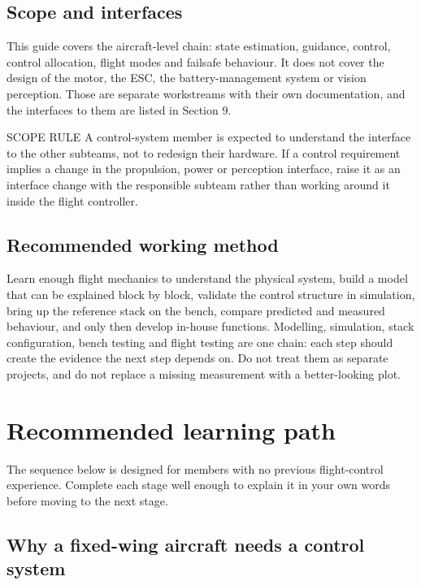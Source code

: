 \documentclass[11pt,a4paper]{article}
\begin{document}
\subsection{Scope and interfaces}

This guide covers the aircraft-level chain: state estimation, guidance,
control, control allocation, flight modes and failsafe behaviour. It does not
cover the design of the motor, the ESC, the battery-management system or
vision perception. Those are separate workstreams with their own documentation,
and the interfaces to them are listed in Section 9.

\begin{callout}{SCOPE RULE}
  A control-system member is expected to understand the interface to the other
  subteams, not to redesign their hardware. If a control requirement implies a
  change in the propulsion, power or perception interface, raise it as an
  interface change with the responsible subteam rather than working around it
  inside the flight controller.
\end{callout}

\subsection{Recommended working method}

Learn enough flight mechanics to understand the physical system, build a model
that can be explained block by block, validate the control structure in
simulation, bring up the reference stack on the bench, compare predicted and
measured behaviour, and only then develop in-house functions. Modelling,
simulation, stack configuration, bench testing and flight testing are one
chain: each step should create the evidence the next step depends on. Do not
treat them as separate projects, and do not replace a missing measurement with
a better-looking plot.

\section{Recommended learning path}

The sequence below is designed for members with no previous flight-control
experience. Complete each stage well enough to explain it in your own words
before moving to the next stage.

\subsection{Why a fixed-wing aircraft needs a control system}
\end{document}
